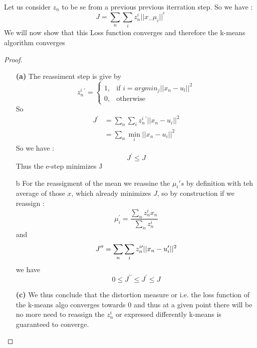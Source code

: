 
Let us consider $z_n$ to be se from a previous previous iterration step. So we have :
\[
J= \sum_n \sum_i z_n^i||x_-\mu_i||^²    
\]
We will now show that this Loss function converges and therefore the k-means algorithm converges

\begin{proof}
    


\begin{itemize}
    \item[\textbf{(a)}] The reassiment step is give by 
\[
z_n^i^\prime = \begin{cases}
    1,& \text{if } i = argmin_j||x_n-u_l||^2\\
    0,              & \text{otherwise}
\end{cases}    
\] 
So 
\begin{align*}
    J^\prime    &= \sum_n \sum_i z_n^i^\prime ||x_n-u_i||^2 \\
                &= \sum_n \min_i||x_n-u_i||^2
\end{align*}
So we have :
\[
    J^\prime \leq J
\]
Thus the e-step minimizes J
 \item[b] For the reassigment of the mean we reassine the $\mu_i's$ by definition with teh average of those $x$, which already minimizes $J$, so by construction if we reassign :
  \[
  \mu_i^{\prime}=\frac{\sum_n z_n^ix_n}{\sum_nz_n^i}    
  \]
  and
  \[
  J^{\prime \prime} = \sum_n \sum_i z_n^{i\prime} ||x_n-u_i^\prime||^2 \\ 
  \]
    we have 
    \[
    0 \leq J^{\prime \prime} \leq J^\prime \leq J    
    \]
\item[\textbf{(c)}] We thus conclude that the distortion measure or i.e. the loss function of the k-means algo converges towards $0$ and thus at a given point there will be no more need to reassign the $z_n^i$ or expressed differently k-means is guaranteed to converge.
\end{itemize}

\end{proof}
